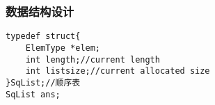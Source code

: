 \documentclass[a4paper,11pt]{article}%
\begin{document}
\subsubsection{数据结构设计}
\begin{lstlisting}[language={[ANSI]C},keywordstyle=\color{blue!70},commentstyle=\color{red!50!green!50!blue!50},frame=shadowbox,
    rulesepcolor=\color{red!20!green!20!blue!20}]
typedef struct{
	ElemType *elem;
	int length;//current length
	int listsize;//current allocated size
}SqList;//顺序表
SqList ans;
\end{lstlisting}

\end{document}

